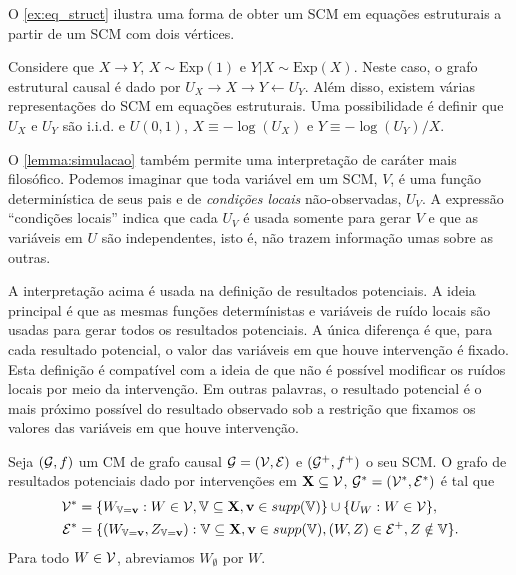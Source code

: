 O \cref{ex:eq_struct} ilustra
uma forma de obter 
um SCM em equações estruturais
a partir de um SCM com dois vértices.
 
\begin{example}
 \label{ex:eq_struct}
 Considere que $X \rightarrow Y$,
 $X \sim \text{Exp}(1)$ e $Y|X \sim \text{Exp}(X)$.
 Neste caso, o grafo estrutural causal é
 dado por $U_X \rightarrow X \rightarrow Y \leftarrow U_Y$.
 Além disso, existem várias representações do SCM
 em equações estruturais. Uma possibilidade é
 definir que $U_X$ e $U_Y$ são i.i.d. e $U(0,1)$,
 $X \equiv -\log(U_X)$ e $Y \equiv -\log(U_Y)/X$.
\end{example}
 
O \cref{lemma:simulacao} também permite
uma interpretação de caráter mais filosófico.
Podemos imaginar que toda variável em um SCM, $V$, é
uma função determinística de seus pais e
de \textit{condições locais} não-observadas, $U_V$.
A expressão ``condições locais'' indica que
cada $U_V$ é usada somente para gerar $V$ e que
as variáveis em $U$ são independentes, isto é,
não trazem informação umas sobre as outras.

A interpretação acima é usada
na definição de resultados potenciais.
A ideia principal é que 
as mesmas funções determínistas e
variáveis de ruído locais são usadas
para gerar todos os resultados potenciais.
A única diferença é que,
para cada resultado potencial,
o valor das variáveis em que 
houve intervenção é fixado.
Esta definição é compatível com 
a ideia de que não é possível modificar
os ruídos locais por meio da intervenção.
Em outras palavras, 
o resultado potencial é o mais próximo possível
do resultado observado sob a restrição que
fixamos os valores das variáveis em que
houve intervenção.

\begin{definition}
 \label{def:grafo_potencial}
 Seja $({\mathcal G}, f)$ um CM de grafo causal 
 ${\mathcal G} = ({\mathcal V}, {\mathcal E})$ e
 $({\mathcal G}^+, f^+)$ o seu SCM.
 O grafo de resultados potenciais dado
 por intervenções em ${\mathbf{X}} \subseteq {\mathcal V}$,
 ${\mathcal G}^* = ({\mathcal V}^*, {\mathcal E}^*)$ é tal que
 \begin{align*}
  {\mathcal V}^* &= \{W_{{\mathbb V}={\mathbf{v}}}: W \in {\mathcal V}, {\mathbb V} \subseteq {\mathbf{X}}, {\mathbf{v}} \in supp({\mathbb V})\} \cup \{U_W: W \in {\mathcal V}\}, \\
  {\mathcal E}^* &= \{(W_{{\mathbb V}={\mathbf{v}}}, Z_{{\mathbb V}={\mathbf{v}}}): {\mathbb V} \subseteq {\mathbf{X}}, {\mathbf{v}} \in supp({\mathbb V}),
  (W, Z) \in {\mathcal E}^{+}, Z \notin {\mathbb V}\}.
 \end{align*}
 Para todo $W \in {\mathcal V}$, abreviamos $W_{\emptyset}$ por $W$.
\end{definition}
 
